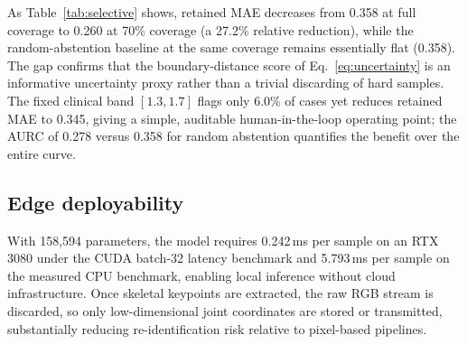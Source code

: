 \documentclass[preprint,12pt]{elsarticle}
\begin{document}
\begin{table}[htpb]
\centering
\caption{Selective prediction (risk--coverage) on the combined CNUH+CARE-PD
cohort. At each
target coverage, the threshold $\tau$ flags the most boundary-proximal cases via
Eq.~\eqref{eq:uncertainty}. We report MAE and F1$_{0\text{--}3}$ on the retained
(auto-scored) subset, and the MAE of a random-abstention baseline at matched
coverage. The final row is the fixed clinical band $[1.3,1.7]$.}
\label{tab:selective}
\end{table}

As Table~\ref{tab:selective} shows, retained MAE decreases from 0.358 at full
coverage to 0.260 at 70\% coverage (a 27.2\% relative reduction),
while the random-abstention baseline at the same coverage remains essentially
flat (0.358). The gap confirms that the boundary-distance score of
Eq.~\eqref{eq:uncertainty} is an informative uncertainty proxy rather than a
trivial discarding of hard samples. The fixed clinical band $[1.3,1.7]$ flags
only 6.0\% of cases yet reduces retained MAE to 0.345, giving a simple,
auditable human-in-the-loop operating point; the AURC of 0.278 versus
0.358 for random abstention quantifies the benefit over the entire curve.

\subsection{Edge deployability}
\label{sec:deploy}
With 158{,}594 parameters, the model requires 0.242\,ms per sample on an RTX
3080 under the CUDA batch-32 latency benchmark and 5.793\,ms per sample on the
measured CPU benchmark, enabling local inference without cloud infrastructure.
Once skeletal keypoints are extracted, the raw RGB stream is
discarded, so only low-dimensional joint coordinates are stored or transmitted,
substantially reducing re-identification risk relative to pixel-based pipelines.
\end{document}
